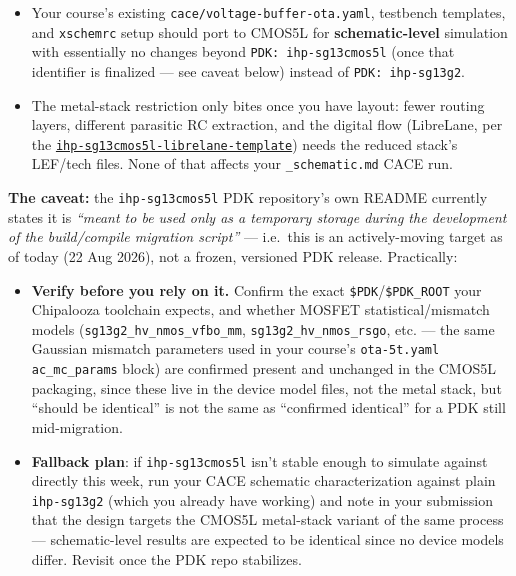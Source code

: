 \documentclass[
]{article}
\providecommand{\tightlist}{%
  \setlength{\itemsep}{0pt}\setlength{\parskip}{0pt}}
\begin{document}
\begin{itemize}
\tightlist
\item
  Your course's existing \texttt{cace/voltage-buffer-ota.yaml},
  testbench templates, and \texttt{xschemrc} setup should port to CMOS5L
  for \textbf{schematic-level} simulation with essentially no changes
  beyond \texttt{PDK:\ ihp-sg13cmos5l} (once that identifier is
  finalized --- see caveat below) instead of \texttt{PDK:\ ihp-sg13g2}.
\item
  The metal-stack restriction only bites once you have layout: fewer
  routing layers, different parasitic RC extraction, and the digital
  flow (LibreLane, per the
  \href{https://github.com/tatzelbrumm/ihp-sg13cmos5l-librelane-template}{\texttt{ihp-sg13cmos5l-librelane-template}})
  needs the reduced stack's LEF/tech files. None of that affects your
  \texttt{\_schematic.md} CACE run.
\end{itemize}

\textbf{The caveat:} the \texttt{ihp-sg13cmos5l} PDK repository's own
README currently states it is \emph{``meant to be used only as a
temporary storage during the development of the build/compile migration
script''} --- i.e.~this is an actively-moving target as of today (22 Aug
2026), not a frozen, versioned PDK release. Practically:

\begin{itemize}
\tightlist
\item
  \textbf{Verify before you rely on it.} Confirm the exact
  \texttt{\$PDK}/\texttt{\$PDK\_ROOT} your Chipalooza toolchain expects,
  and whether MOSFET statistical/mismatch models
  (\texttt{sg13g2\_hv\_nmos\_vfbo\_mm}, \texttt{sg13g2\_hv\_nmos\_rsgo},
  etc. --- the same Gaussian mismatch parameters used in your course's
  \texttt{ota-5t.yaml} \texttt{ac\_mc\_params} block) are confirmed
  present and unchanged in the CMOS5L packaging, since these live in the
  device model files, not the metal stack, but ``should be identical''
  is not the same as ``confirmed identical'' for a PDK still
  mid-migration.
\item
  \textbf{Fallback plan}: if \texttt{ihp-sg13cmos5l} isn't stable enough
  to simulate against directly this week, run your CACE schematic
  characterization against plain \texttt{ihp-sg13g2} (which you already
  have working) and note in your submission that the design targets the
  CMOS5L metal-stack variant of the same process --- schematic-level
  results are expected to be identical since no device models differ.
  Revisit once the PDK repo stabilizes.
\end{itemize}
\end{document}
